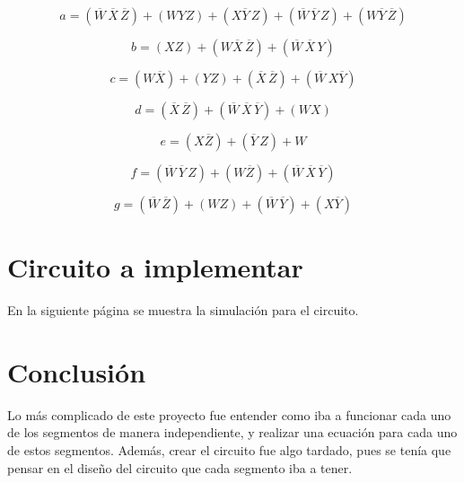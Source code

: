 \documentclass[12pt, oneside, openany]{article}
\begin{document}
\newpage
\begin{equation*}
    a = (\overline{W}\,\overline{X}\,\overline{Z})+(WYZ)+(X\overline{Y}\,Z)+(\overline{W}\,\overline{Y}\,Z)+(W\overline{Y}\,\overline{Z})
\end{equation*}

\begin{equation*}
    b = (XZ)+(W\overline{X}\,\overline{Z})+(\overline{W}\,\overline{X}\,Y)
\end{equation*}

\begin{equation*}
    c = (W\overline{X})+(YZ)+(\overline{X}\,\overline{Z})+(\overline{W}\,X\overline{Y})
\end{equation*}

\begin{equation*}
    d = (\overline{X}\,\overline{Z})+(\overline{W}\,\overline{X}\,\overline{Y})+(WX)
\end{equation*}

\begin{equation*}
    e = (X\overline{Z})+(\overline{Y}\,Z)+W
\end{equation*}

\begin{equation*}
    f = (\overline{W}\,\overline{Y}\,Z)+(W\overline{Z})+(\overline{W}\,\overline{X}\,\overline{Y})
\end{equation*}

\begin{equation*}
    g = (\overline{W}\,\overline{Z})+(WZ)+(\overline{W}\,\overline{Y})+(X\overline{Y})
\end{equation*}

\section{Circuito a implementar}
{\sffamily\large
    \hspace{0.5cm} En la siguiente página se muestra la simulación para el circuito.
}

\newpage


\newpage
\section{Conclusión}
{\sffamily\large
    \hspace{0.5cm} Lo más complicado de este proyecto fue entender como iba a funcionar cada uno de los segmentos de manera independiente, y realizar una ecuación para cada uno de estos segmentos. Además, crear el circuito fue algo tardado, pues se tenía que pensar en el diseño del circuito que cada segmento iba a tener.
}
\end{document}
